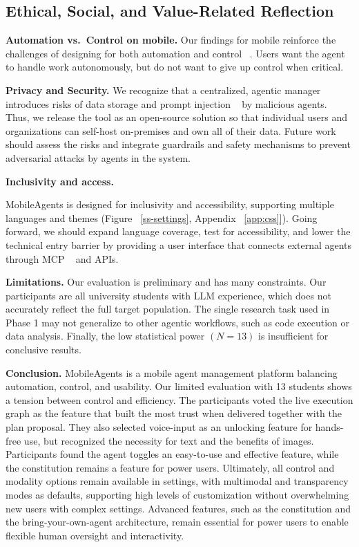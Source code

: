 \documentclass[sigconf, anonymous]{acmart}
\begin{document}
\subsection{Ethical, Social, and Value-Related Reflection}

\textbf{Automation vs.\ Control on mobile.} Our findings for mobile reinforce the challenges of designing for both automation and control ~\cite{doi:10.1518/hfes,doi:10.1518/001872097778543886}. Users want the agent to handle work autonomously, but do not want to give up control when critical.

\textbf{Privacy and Security.} We recognize that a centralized, agentic manager introduces risks of data storage and prompt injection ~\cite{10.1145/3605764.3623985} by malicious agents. Thus, we release the tool as an open-source solution so that individual users and organizations can self-host on-premises and own all of their data. Future work should assess the risks and integrate guardrails and safety mechanisms to prevent adversarial attacks by agents in the system.

\textbf{Inclusivity and access.}

MobileAgents is designed for inclusivity and accessibility, supporting multiple languages and themes (Figure ~\ref{ss-settings}, Appendix ~\ref{app:css}]). Going forward, we should expand language coverage, test for accessibility, and lower the technical entry barrier by providing a user interface that connects external agents through MCP ~\cite{anthropic_2024_introducing} and APIs.

\textbf{Limitations.} Our evaluation is preliminary and has many constraints. Our participants are all university students with LLM experience, which does not accurately reflect the full target population. The single research task used in Phase 1 may not generalize to other agentic workflows, such as code execution or data analysis. Finally, the low statistical power $(N=13)$ is insufficient for conclusive results.

\textbf{Conclusion.}  MobileAgents is a mobile agent management platform balancing automation, control, and usability. Our limited evaluation with 13 students shows a tension between control and efficiency. The participants voted the live execution graph as the feature that built the most trust when delivered together with the plan proposal. They also selected voice-input as an unlocking feature for hands-free use, but recognized the necessity for text and the benefits of images. Participants found the agent toggles an easy-to-use and effective feature, while the constitution remains a feature for power users. Ultimately, all control and modality options remain available in settings, with multimodal and transparency modes as defaults, supporting high levels of customization without overwhelming  new users with complex settings. Advanced features, such as the constitution and the bring-your-own-agent architecture, remain essential for power users to enable flexible human oversight and interactivity.
\end{document}
